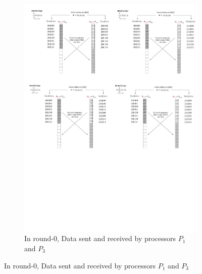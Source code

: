 \documentclass[submission]{iacrtrans}
\theoremstyle{plain}
\begin{document}
\begin{figure}[!tb]
\begin{subfigure}[b]{.47\textwidth}
\includegraphics[width=\textwidth]{./fig/DataSwapWithoutPerm2.pdf}
\caption{In round-0, Data sent and received by processors $P_1$ and $P_3$}\label{fig:dataswap_without_perm2}
\end{subfigure}


\end{figure}
\end{document}
